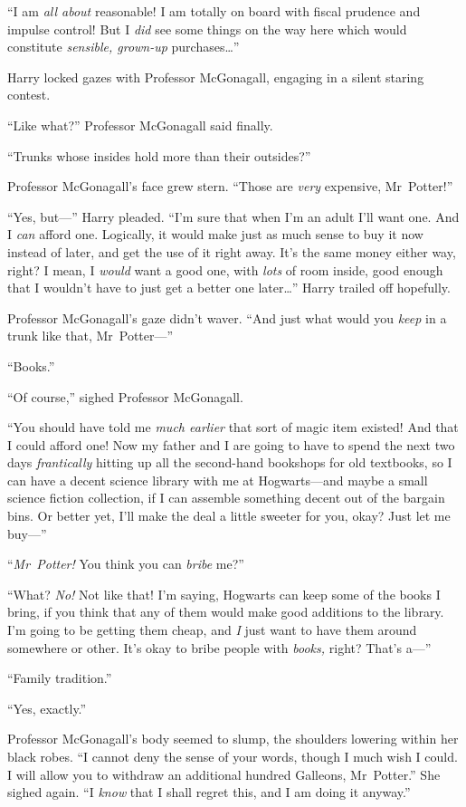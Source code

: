 “I am \emph{all about} reasonable! I am totally on board with fiscal prudence and impulse control! But I \emph{did} see some things on the way here which would constitute \emph{sensible, grown-up} purchases…”

Harry locked gazes with Professor McGonagall, engaging in a silent staring contest.

“Like what?” Professor McGonagall said finally.

“Trunks whose insides hold more than their outsides?”

Professor McGonagall’s face grew stern. “Those are \emph{very} expensive, Mr~Potter!”

“Yes, but—” Harry pleaded. “I’m sure that when I’m an adult I’ll want one. And I \emph{can} afford one. Logically, it would make just as much sense to buy it now instead of later, and get the use of it right away. It’s the same money either way, right? I mean, I \emph{would} want a good one, with \emph{lots} of room inside, good enough that I wouldn’t have to just get a better one later…” Harry trailed off hopefully.

Professor McGonagall’s gaze didn’t waver. “And just what would you \emph{keep} in a trunk like that, Mr~Potter—”

“Books.”

“Of course,” sighed Professor McGonagall.

“You should have told me \emph{much earlier} that sort of magic item existed! And that I could afford one! Now my father and I are going to have to spend the next two days \emph{frantically} hitting up all the second-hand bookshops for old textbooks, so I can have a decent science library with me at Hogwarts—and maybe a small science fiction collection, if I can assemble something decent out of the bargain bins. Or better yet, I’ll make the deal a little sweeter for you, okay? Just let me buy—”

“\emph{Mr~Potter!} You think you can \emph{bribe} me?”

“What? \emph{No!} Not like that! I’m saying, Hogwarts can keep some of the books I bring, if you think that any of them would make good additions to the library. I’m going to be getting them cheap, and \emph{I} just want to have them around somewhere or other. It’s okay to bribe people with \emph{books,} right? That’s a—”

“Family tradition.”

“Yes, exactly.”

Professor McGonagall’s body seemed to slump, the shoulders lowering within her black robes. “I cannot deny the sense of your words, though I much wish I could. I will allow you to withdraw an additional hundred Galleons, Mr~Potter.” She sighed again. “I \emph{know} that I shall regret this, and I am doing it anyway.”

